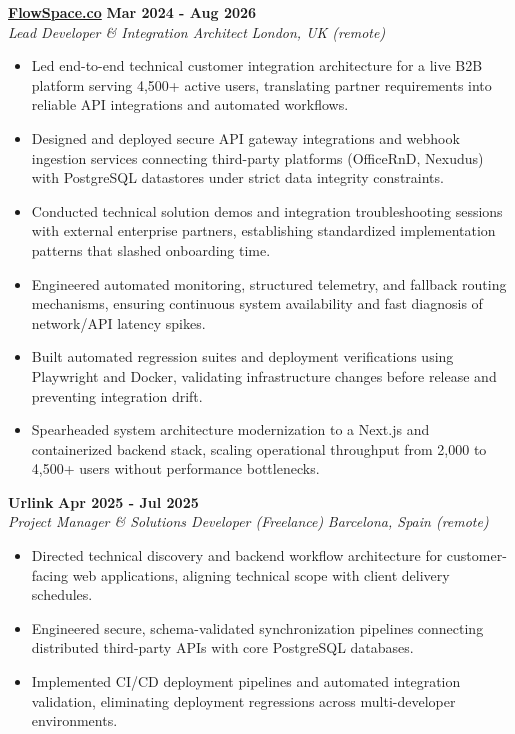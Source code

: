 \documentclass[10pt,a4paper]{article}
\newcommand{\role}[4]{%
  \textbf{#1} \hfill \textbf{#2}\\[1pt]%
  \textit{#3} \hfill \textit{#4}\\[2pt]%
}
\begin{document}
\role{\href{https://flowspace.co}{FlowSpace.co}}{Mar 2024 - Aug 2026}{Lead Developer \& Integration Architect}{London, UK (remote)}
\begin{itemize}
  \item Led end-to-end technical customer integration architecture for a live B2B platform serving 4,500+ active users, translating partner requirements into reliable API integrations and automated workflows.
  \item Designed and deployed secure API gateway integrations and webhook ingestion services connecting third-party platforms (OfficeRnD, Nexudus) with PostgreSQL datastores under strict data integrity constraints.
  \item Conducted technical solution demos and integration troubleshooting sessions with external enterprise partners, establishing standardized implementation patterns that slashed onboarding time.
  \item Engineered automated monitoring, structured telemetry, and fallback routing mechanisms, ensuring continuous system availability and fast diagnosis of network/API latency spikes.
  \item Built automated regression suites and deployment verifications using Playwright and Docker, validating infrastructure changes before release and preventing integration drift.
  \item Spearheaded system architecture modernization to a Next.js and containerized backend stack, scaling operational throughput from 2,000 to 4,500+ users without performance bottlenecks.
\end{itemize}

\role{Urlink}{Apr 2025 - Jul 2025}{Project Manager \& Solutions Developer (Freelance)}{Barcelona, Spain (remote)}
\begin{itemize}
  \item Directed technical discovery and backend workflow architecture for customer-facing web applications, aligning technical scope with client delivery schedules.
  \item Engineered secure, schema-validated synchronization pipelines connecting distributed third-party APIs with core PostgreSQL databases.
  \item Implemented CI/CD deployment pipelines and automated integration validation, eliminating deployment regressions across multi-developer environments.
\end{itemize}
\end{document}

